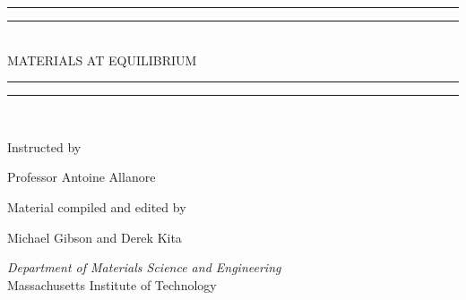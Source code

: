 \documentclass[11pt]{report}
\newlength{\drop}
\begin{document}
  \begin{titlepage}
    \textheight
    \centering
    \vspace*{\baselineskip}
    \rule{\textwidth}{1.6pt}\vspace*{-\baselineskip}\vspace*{2pt}
    \rule{\textwidth}{0.4pt}\\[\baselineskip]
    {\LARGE MATERIALS AT EQUILIBRIUM}\\[0.2\baselineskip]
    \rule{\textwidth}{0.4pt}\vspace*{-\baselineskip}\vspace{3.2pt}
    \rule{\textwidth}{1.6pt}\\[\baselineskip]
    \scshape

    \vspace*{2\baselineskip}
    Instructed by \\
    {\Large Professor Antoine Allanore\par} \vspace{2 em}
    \vfill
    Material compiled and edited by\\
    {\Large Michael Gibson and Derek Kita \par} \vspace{2 em}
    {\itshape  Department of Materials Science and Engineering \vspace*{0 em}}\\
    {\large Massachusetts Institute of Technology}\par
  \end{titlepage}
\end{document}
